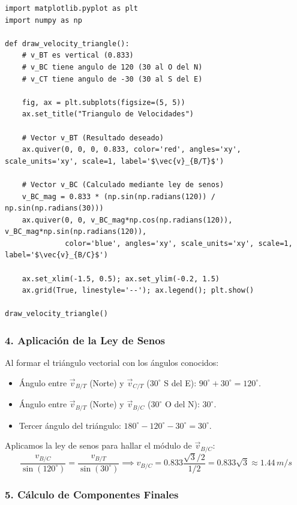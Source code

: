 \documentclass[12pt, a4paper]{article}
\begin{document}
\begin{lstlisting}
import matplotlib.pyplot as plt
import numpy as np

def draw_velocity_triangle():
    # v_BT es vertical (0.833)
    # v_BC tiene angulo de 120 (30 al O del N)
    # v_CT tiene angulo de -30 (30 al S del E)
    
    fig, ax = plt.subplots(figsize=(5, 5))
    ax.set_title("Triangulo de Velocidades")
    
    # Vector v_BT (Resultado deseado)
    ax.quiver(0, 0, 0, 0.833, color='red', angles='xy', scale_units='xy', scale=1, label='$\vec{v}_{B/T}$')
    
    # Vector v_BC (Calculado mediante ley de senos)
    v_BC_mag = 0.833 * (np.sin(np.radians(120)) / np.sin(np.radians(30)))
    ax.quiver(0, 0, v_BC_mag*np.cos(np.radians(120)), v_BC_mag*np.sin(np.radians(120)), 
              color='blue', angles='xy', scale_units='xy', scale=1, label='$\vec{v}_{B/C}$')
              
    ax.set_xlim(-1.5, 0.5); ax.set_ylim(-0.2, 1.5)
    ax.grid(True, linestyle='--'); ax.legend(); plt.show()

draw_velocity_triangle()
\end{lstlisting}

\subsubsection*{4. Aplicación de la Ley de Senos}

Al formar el triángulo vectorial con los ángulos conocidos:
\begin{itemize}
    \item Ángulo entre $\vec{v}_{B/T}$ (Norte) y $\vec{v}_{C/T}$ ($30^\circ$ S del E): $90^\circ + 30^\circ = 120^\circ$.
    \item Ángulo entre $\vec{v}_{B/T}$ (Norte) y $\vec{v}_{B/C}$ ($30^\circ$ O del N): $30^\circ$.
    \item Tercer ángulo del triángulo: $180^\circ - 120^\circ - 30^\circ = 30^\circ$.
\end{itemize}

Aplicamos la ley de senos para hallar el módulo de $\vec{v}_{B/C}$:
\begin{equation}
    \frac{v_{B/C}}{\sin(120^\circ)} = \frac{v_{B/T}}{\sin(30^\circ)} \implies v_{B/C} = 0.833 \frac{\sqrt{3}/2}{1/2} = 0.833 \sqrt{3} \approx 1.44 \, \si{m/s}
\end{equation}

\subsubsection*{5. Cálculo de Componentes Finales}
\end{document}
